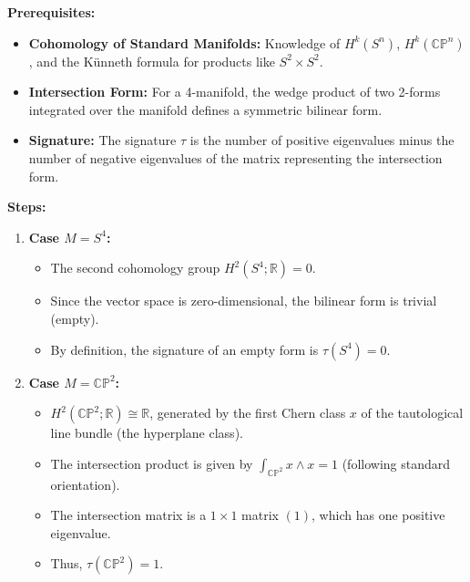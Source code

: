 \begin{solution}
\textbf{Prerequisites:}
\begin{itemize}
    \item \textbf{Cohomology of Standard Manifolds:} Knowledge of $H^k(S^n)$, $H^k(\mathbb{CP}^n)$, and the K\"unneth formula for products like $S^2 \times S^2$.
    \item \textbf{Intersection Form:} For a 4-manifold, the wedge product of two 2-forms integrated over the manifold defines a symmetric bilinear form.
    \item \textbf{Signature:} The signature $\tau$ is the number of positive eigenvalues minus the number of negative eigenvalues of the matrix representing the intersection form.
\end{itemize}

\medskip
\textbf{Steps:}
\begin{enumerate}
    \item \textbf{Case $M = S^4$:}
    \begin{itemize}
        \item The second cohomology group $H^2(S^4; \mathbb{R}) = 0$.
        \item Since the vector space is zero-dimensional, the bilinear form is trivial (empty).
        \item By definition, the signature of an empty form is $\tau(S^4) = 0$.
    \end{itemize}

    \medskip
    \item \textbf{Case $M = \mathbb{CP}^2$:}
    \begin{itemize}
        \item $H^2(\mathbb{CP}^2; \mathbb{R}) \cong \mathbb{R}$, generated by the first Chern class $x$ of the tautological line bundle (the hyperplane class).
        \item The intersection product is given by $\int_{\mathbb{CP}^2} x \wedge x = 1$ (following standard orientation).
        \item The intersection matrix is a $1 \times 1$ matrix $(1)$, which has one positive eigenvalue.
        \item Thus, $\tau(\mathbb{CP}^2) = 1$.
    \end{itemize}


\end{enumerate}
\end{solution}
